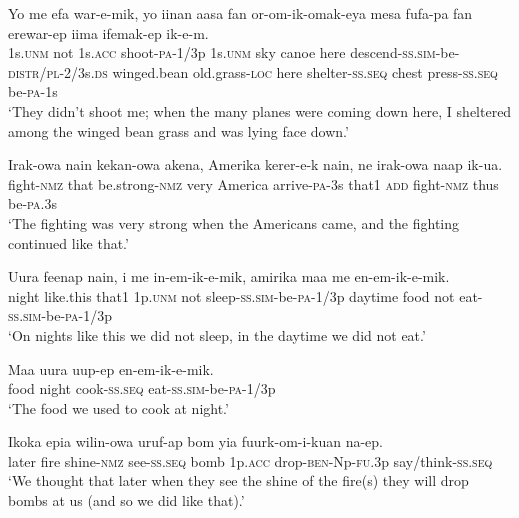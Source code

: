 \ea
\gll  Yo  me  efa  war-e-mik,  yo  iinan  aasa  fan or-om-ik-omak-eya  mesa  fufa-pa  fan  erewar-ep  iima  ifemak-ep  ik-e-m. \\
1s.\textsc{unm}  not  1s.\textsc{acc}  shoot-\textsc{pa}-1/3p  1s.\textsc{unm}  sky  canoe  here descend-\textsc{ss}.\textsc{sim}-be-\textsc{distr}/\textsc{pl}-2/3s.\textsc{ds}  winged.bean  old.grass-\textsc{loc} here  shelter-\textsc{ss.seq}  chest  press-\textsc{ss.seq}  be-\textsc{pa}-1s \\
\glt ‘They didn’t shoot me; when the many planes were coming down here, I sheltered among the winged bean grass and was lying face down.’ \\
\z


\ea
\gll  Irak-owa  nain  kekan-owa  akena,  Amerika  kerer-e-k  nain,  ne  irak-owa  naap  ik-ua. \\
fight-\textsc{nmz}  that  be.strong-\textsc{nmz}  very  America  arrive-\textsc{pa}-3s  that1 \textsc{add}  fight-\textsc{nmz}  thus  be-\textsc{pa}.3s \\
\glt ‘The fighting was very strong when the Americans came, and the fighting continued like that.’ \\
\z


\ea
\gll  Uura  feenap  nain,  i  me  in-em-ik-e-mik,  amirika maa  me  en-em-ik-e-mik. \\
night  like.this  that1  1p.\textsc{unm}  not  sleep-\textsc{ss}.\textsc{sim}-be-\textsc{pa}-1/3p  daytime   food  not  eat-\textsc{ss}.\textsc{sim}-be-\textsc{pa}-1/3p\\
\glt ‘On nights like this we did not sleep, in the daytime we did not eat.’ \\
\z


\ea
\gll  Maa  uura  uup-ep  en-em-ik-e-mik. \\
food  night  cook-\textsc{ss.seq}  eat-\textsc{ss}.\textsc{sim}-be-\textsc{pa}-1/3p \\
\glt ‘The food we used to cook at night.’ \\
\z


\ea
\gll  Ikoka  epia  wilin-owa  uruf-ap  bom  yia   fuurk-om-i-kuan  na-ep. \\
later  fire  shine-\textsc{nmz}  see-\textsc{ss.seq}  bomb  1p.\textsc{acc}  drop-\textsc{ben}-Np-\textsc{fu}.3p  say/think-\textsc{ss.seq} \\ 
\glt ‘We thought that later when they see the shine of the fire(s) they will drop bombs at us (and so we did like that).’ \\
\z


